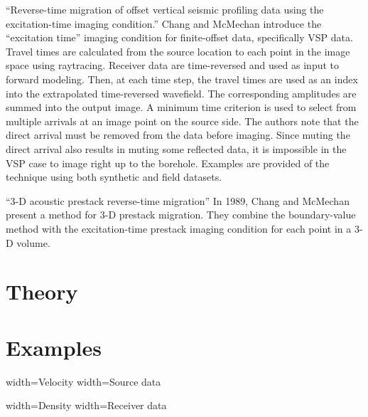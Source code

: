 ``Reverse-time migration of offset vertical seismic profiling data
using the excitation-time imaging condition.'' Chang and McMechan
introduce the ``excitation time'' imaging condition for finite-offset
data, specifically VSP data. Travel times are calculated from the
source location to each point in the image space using
raytracing. Receiver data are time-reversed and used as input to
forward modeling. Then, at each time step, the travel times are used
as an index into the extrapolated time-reversed wavefield.  The
corresponding amplitudes are summed into the output image.  A minimum
time criterion is used to select from multiple arrivals at an image
point on the source side. The authors note that the direct arrival
must be removed from the data before imaging.  Since muting the direct
arrival also results in muting some reflected data, it is impossible
in the VSP case to image right up to the borehole.  Examples are
provided of the technique using both synthetic and field datasets.
\citep{changmechmechan1986}

``3-D acoustic prestack reverse-time migration'' In 1989, Chang and
McMechan present a method for 3-D prestack migration.  They combine
the boundary-value method with the excitation-time prestack imaging
condition for each point in a 3-D volume.\citep{changandmcmechan1989b}

\section{Theory}

\section{Examples}


   {width=\textwidth}{Velocity}
   {width=\textwidth}{Source data}

  {width=\textwidth}{Density}
  {width=\textwidth}{Receiver data}



\nocite{*}


